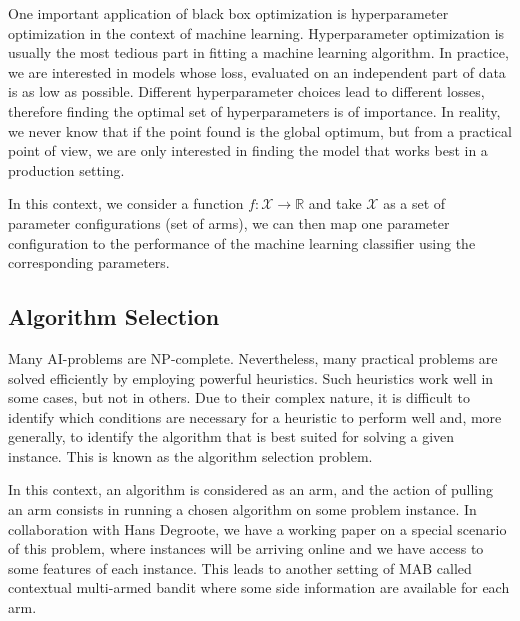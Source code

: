 \documentclass[12pt]{article}
\theoremstyle{plain} \numberwithin{equation}{section}
\theoremstyle{definition}
\begin{document}
One important application of black box optimization is hyperparameter optimization in the context of machine learning. Hyperparameter optimization is usually the most tedious part in fitting a machine learning algorithm. In practice, we are interested in models whose loss, evaluated on an independent part of data is as low as possible. Different hyperparameter choices lead to different losses, therefore finding the optimal set of hyperparameters is of importance. In reality, we never know that if the point found is the global optimum, but from a practical point of view, we are only interested in finding the model that works best in a production setting.

In this context, we consider a function $f:\mathcal{X}\rightarrow\mathbb{R}$ and take $\mathcal{X}$ as a set of parameter configurations (set of arms), we can then map one parameter configuration to the performance of the machine learning classifier using the corresponding parameters.

\subsection{Algorithm Selection}

Many AI-problems are NP-complete. Nevertheless, many practical problems are solved efficiently by employing powerful heuristics. Such heuristics work well in some cases, but not in others. Due to their complex nature, it is difficult to identify which conditions are necessary for a heuristic to perform well and, more generally, to identify the algorithm that is best suited for solving a given instance. This is known as the algorithm selection problem.

In this context, an algorithm is considered as an arm, and the action of pulling an arm consists in running a chosen algorithm on some problem instance. In collaboration with Hans Degroote, we have a working paper on a special scenario of this problem, where instances will be arriving online and we have access to some features of each instance. This leads to another setting of MAB called contextual multi-armed bandit where some side information are available for each arm.
\end{document}
